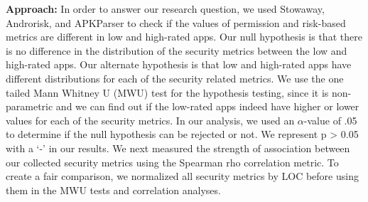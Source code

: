 \documentclass{sig-alternate-05-2015}
\begin{document}








\textbf{Approach:} In order to answer our research question, we used Stowaway, Androrisk, and APKParser to check if the values of permission and risk-based metrics are different in low and high-rated apps. Our null hypothesis is that there is no difference in the distribution of the security metrics between the low and high-rated apps. Our alternate hypothesis is that low and high-rated apps have different distributions for each of the security related metrics. We use the one tailed Mann Whitney U (MWU) test for the hypothesis testing, since it is non-parametric and we can find out if the low-rated apps indeed have higher or lower values for each of the security metrics. In our analysis, we used an $\alpha$-value of .05 to determine if the null hypothesis can be rejected or not. We represent p > 0.05 with a `-' in our results. We next measured the strength of association between our collected security metrics using the Spearman rho correlation metric. To create a fair comparison, we normalized all security metrics by LOC before using them in the MWU tests and correlation analyses.



\end{document}
